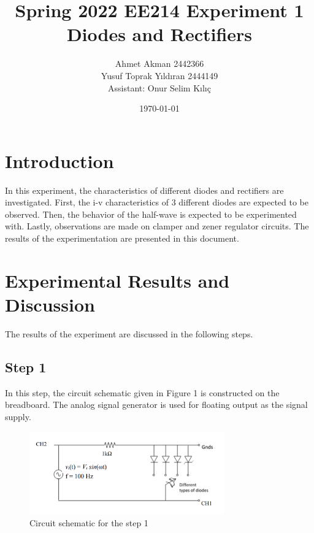 \documentclass[letterpaper,12pt]{article}
\begin{document}
\thispagestyle{empty}

\title{Spring 2022 EE214 Experiment 1  \protect\\ Diodes and Rectifiers}
\author{Ahmet Akman 2442366 \protect\\ Yusuf Toprak Yıldıran 2444149 \protect\\ Assistant: Onur Selim Kılıç}
\date{\today}
\maketitle
\tableofcontents
\section{Introduction}
In this experiment, the characteristics of different diodes and rectifiers are investigated. First, the i-v characteristics of 3 different diodes are expected to be observed. Then, the behavior of the half-wave is expected to be experimented with. Lastly, observations are made on clamper and zener regulator circuits. The results of the experimentation are presented in this document.
\section{Experimental Results and Discussion}
The results of the experiment are discussed in the following steps.
\subsection{Step 1}
In this step, the circuit schematic given in Figure 1 is constructed on the breadboard. The analog signal generator is used for floating output as the signal supply.
\begin{figure}[H]
\centering
\includegraphics[width = 0.75\textwidth]{1_1.png}
\caption{Circuit schematic for the step 1}
\end{figure} 
\end{document}

